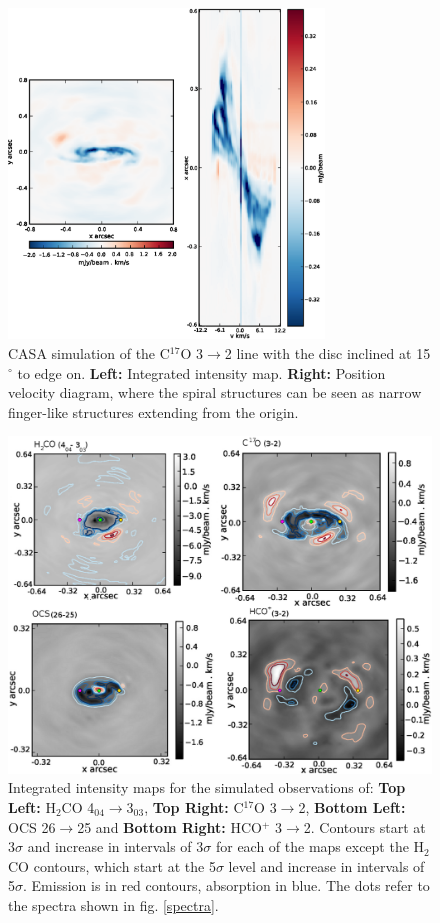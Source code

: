 \documentclass[useAMS,usenatbib]{mn2e}
\begin{document}
\begin{figure}
 \includegraphics[width=84mm]{Figures/sim/casa_C17O_15deg_all3.eps}

 \caption{CASA simulation of the C$^{17}$O 3$\rightarrow$2 line with the disc inclined at 15$^\circ$ to edge on. {\bf Left:} Integrated intensity map. {\bf Right:} Position velocity diagram, where the spiral structures can be seen as narrow finger-like structures extending from the origin.}
 \label{15deg}
\end{figure}


\begin{figure}
 \includegraphics[width=140mm]{Figures/sim/casa_all_30deg_contSub_dots.eps}
 \caption{Integrated intensity maps for the simulated observations of: {\bf Top Left:} H$_2$CO 4$_{04}\rightarrow$3$_{03}$, {\bf Top Right:} C$^{17}$O 3$\rightarrow$2, {\bf Bottom Left:} OCS 26$\rightarrow$25 and {\bf Bottom Right:} HCO$^+$ 3$\rightarrow$2. Contours start at 3$\sigma$ and increase in intervals of 3$\sigma$ for each of the maps except the H$_2$CO contours, which start at the 5$\sigma$ level and increase in intervals of 5$\sigma$. Emission is in red contours, absorption in blue. The dots refer to the spectra shown in fig. \ref{spectra}.}
\label{mom0_maps}
\end{figure}
\end{document}
